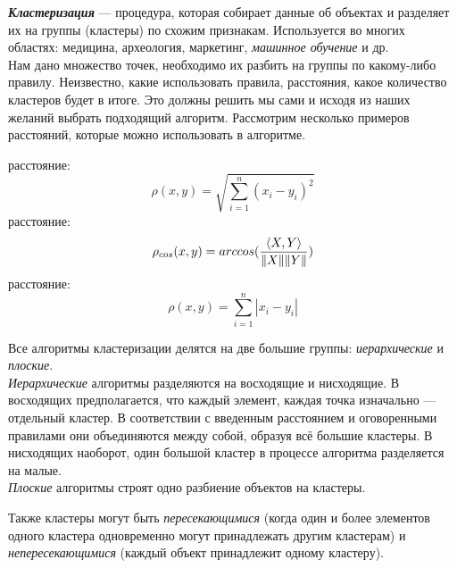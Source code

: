 \documentclass[12pt, a4paper]{article}
\begin{document}
\textit{\textbf{Кластеризация}}  —  процедура, которая собирает данные об объектах и разделяет их на группы (кластеры) по схожим признакам. Используется во многих областях: медицина, археология, маркетинг, \textit{машинное обучение} и др.\\
Нам дано множество точек, необходимо их разбить на группы по какому-либо правилу. Неизвестно, какие использовать правила, расстояния, какое количество кластеров будет в итоге. Это должны решить мы сами и исходя из наших желаний выбрать подходящий алгоритм. Рассмотрим несколько примеров расстояний, которые можно использовать в алгоритме.\\
\begin{itemize}
 расстояние: 
\begin{equation}\label{eq:one}
\rho (x, y) = \sqrt{\sum_{i=1}^n (x_i - y_i)^2}
\end{equation}
 расстояние:
\begin{equation}\label{eq:two}
\rho_{cos} (x, y) = arccos({{\langle X,Y\rangle}\over{\| X \| \| Y \|}})
\end{equation}
 расстояние:
\begin{equation}\label{eq:three}
\rho (x, y) = \sum_{i=1}^n |x_i - y_i|
\end{equation}
\end{itemize}

Все алгоритмы кластеризации делятся на две большие группы: \textit{иерархические} и \textit{плоские}.\\
\textit{Иерархические} алгоритмы разделяются на восходящие и нисходящие. В восходящих предполагается, что каждый элемент, каждая точка изначально — отдельный кластер. В соответствии с введенным расстоянием и оговоренными правилами они объединяются  между собой, образуя всё большие кластеры. В нисходящих наоборот, один большой кластер в процессе алгоритма разделяется на малые. \\
\textit{Плоские} алгоритмы строят одно разбиение объектов на кластеры.

Также кластеры могут быть \textit{пересекающимися} (когда один и более элементов одного кластера одновременно могут принадлежать другим кластерам) и \textit{непересекающимися} (каждый объект принадлежит одному кластеру).
\medskip 
 \medskip 
  \medskip 
   \medskip 
   
\end{document}
